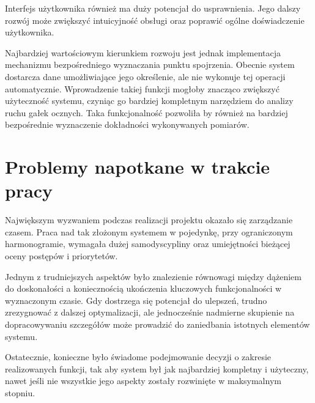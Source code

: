 \documentclass[a4paper,twoside,12pt]{book}
\begin{document}
Interfejs użytkownika również ma duży potencjał do usprawnienia. Jego dalszy rozwój może zwiększyć intuicyjność obsługi oraz poprawić ogólne doświadczenie użytkownika.

Najbardziej wartościowym kierunkiem rozwoju jest jednak implementacja mechanizmu bezpośredniego wyznaczania punktu spojrzenia. Obecnie system dostarcza dane umożliwiające jego określenie, ale nie wykonuje tej operacji automatycznie. Wprowadzenie takiej funkcji mogłoby znacząco zwiększyć użyteczność systemu, czyniąc go bardziej kompletnym narzędziem do analizy ruchu gałek ocznych. Taka funkcjonalność pozwoliła by również na bardziej bezpośrednie wyznaczenie dokładności wykonywanych pomiarów.

\section{Problemy napotkane w trakcie pracy}

Największym wyzwaniem podczas realizacji projektu okazało się zarządzanie czasem. Praca nad tak złożonym systemem w pojedynkę, przy ograniczonym harmonogramie, wymagała dużej samodyscypliny oraz umiejętności bieżącej oceny postępów i priorytetów.

Jednym z trudniejszych aspektów było znalezienie równowagi między dążeniem do doskonałości a koniecznością ukończenia kluczowych funkcjonalności w wyznaczonym czasie. Gdy dostrzega się potencjał do ulepszeń, trudno zrezygnować z dalszej optymalizacji, ale jednocześnie nadmierne skupienie na dopracowywaniu szczegółów może prowadzić do zaniedbania istotnych elementów systemu.

Ostatecznie, konieczne było świadome podejmowanie decyzji o zakresie realizowanych funkcji, tak aby system był jak najbardziej kompletny i użyteczny, nawet jeśli nie wszystkie jego aspekty zostały rozwinięte w maksymalnym stopniu.




\backmatter

\printbibliography           %
\end{document}
